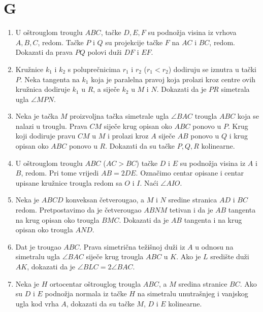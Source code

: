 \documentclass{article}
\begin{document}
\section{G}

\begin{enumerate}
    \item U o\v{s}trouglom trouglu $ABC$, ta\v{c}ke $D, E, F$ su podno\v{z}ja visina iz vrhova $A, B, C$, redom. Ta\v{c}ke $P$ i $Q$ su projekcije ta\v{c}ke $F$ na $AC$ i $BC$, redom. Dokazati da prava $PQ$ polovi du\v{z}i $DF$ i $EF$.

    \item Kru\v{z}nice $k_1$ i $k_2$ s polupre\v{c}nicima $r_1$ i $r_2$ ($r_1 < r_2$) dodiruju se iznutra u ta\v{c}ki $P$. Neka tangenta na $k_1$ koja je paralelna pravoj koja prolazi kroz centre ovih kru\v{z}nica dodiruje $k_1$ u $R$, a sije\v{c}e $k_2$ u $M$ i $N$. Dokazati da je $PR$ simetrala ugla $\angle MPN$.

    \item Neka je ta\v{c}ka $M$ proizvoljna ta\v{c}ka simetrale ugla $\angle BAC$ trougla $ABC$ koja se nalazi u trouglu. Prava $CM$ sije\v{c}e krug opisan oko $ABC$ ponovo u $P$. Krug koji dodiruje pravu $CM$ u $M$ i prolazi kroz $A$ sije\v{c}e $AB$ ponovo u $Q$ i krug opisan oko $ABC$ ponovo u $R$. Dokazati da su ta\v{c}ke $P, Q, R$ kolinearne.

    \item U o\v{s}trouglom trouglu $ABC$ ($AC > BC$) ta\v{c}ke $D$ i $E$ su podno\v{z}ja visina iz $A$ i $B$, redom. Pri tome vrijedi $AB = 2DE$. Ozna\v{c}imo centar opisane i centar upisane kru\v{z}nice trougla redom sa $O$ i $I$. Na\'ci $\angle AIO$.

    \item Neka je $ABCD$ konveksan \v{c}etverougao, a $M$ i $N$ sredine stranica $AD$ i $BC$ redom. Pretpostavimo da je \v{c}etverougao $ABNM$ tetivan i da je $AB$ tangenta na krug opisan oko trougla $BMC$. Dokazati da je $AB$ tangenta i na krug opisan oko trougla $AND$.

    \item Dat je trougao $ABC$. Prava simetri\v{c}na te\v{z}i\v{s}noj du\v{z}i iz $A$ u odnosu na simetralu ugla $\angle BAC$ sije\v{c}e krug trougla $ABC$ u $K$. Ako je $L$ sredi\v{s}te du\v{z}i $AK$, dokazati da je $\angle BLC = 2\angle BAC$.

    \item Neka je $H$ ortocentar o\v{s}trouglog trougla $ABC$, a $M$ sredina stranice $BC$. Ako su $D$ i $E$ podno\v{z}ja normala iz ta\v{c}ke $H$ na simetralu unutra\v{s}njeg i vanjskog ugla kod vrha $A$, dokazati da su ta\v{c}ke $M$, $D$ i $E$ kolinearne.


\end{enumerate}
\end{document}
